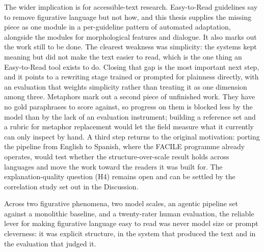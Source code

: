 The wider implication is for accessible-text research. Easy-to-Read guidelines
say to remove figurative language but not how, and this thesis supplies the
missing piece as one module in a per-guideline pattern of automated adaptation,
alongside the modules for morphological features and dialogue. It also marks out
the work still to be done. The clearest weakness was simplicity: the systems
kept meaning but did not make the text easier to read, which is the one thing an
Easy-to-Read tool exists to do. Closing that gap is the most important next
step, and it points to a rewriting stage trained or prompted for plainness
directly, with an evaluation that weights simplicity rather than treating it as
one dimension among three. Metaphors mark out a second piece of unfinished work.
They have no gold paraphrases to score against, so progress on them is blocked
less by the model than by the lack of an evaluation instrument; building a
reference set and a rubric for metaphor replacement would let the field measure
what it currently can only inspect by hand. A third step returns to the original
motivation: porting the pipeline from English to Spanish, where the FACILE
programme already operates, would test whether the structure-over-scale result
holds across languages and move the work toward the readers it was built for.
The explanation-quality question (H4) remains open and can be settled by the
correlation study set out in the Discussion.

Across two figurative phenomena, two model scales, an agentic pipeline set
against a monolithic baseline, and a twenty-rater human evaluation, the reliable
lever for making figurative language easy to read was never model size or
prompt cleverness: it was explicit structure, in the system that produced the
text and in the evaluation that judged it.

\newpage
